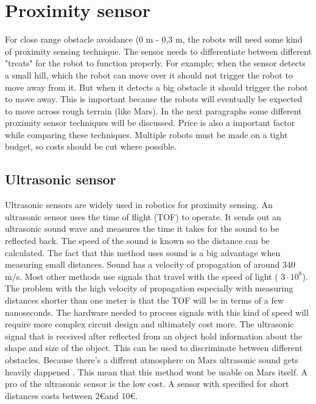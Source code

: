 \documentclass[10pt,a4paper]{article}
\begin{document}
\newpage

\section{Proximity sensor}
For close range obstacle avoidance (0 m - 0,3 m, the robots will need some kind of proximity sensing technique. The sensor needs to differentiate between different "treats" for the robot to function properly. For example; when the sensor detects a small hill, which the robot can move over it should not trigger the robot to move away from it. But when it detects a big obstacle it should trigger the robot to move away. This is important because the robots will eventually be expected to move across rough terrain (like Mars). In the next paragraphs some different proximity sensor techniques will be discussed. Price is also a important factor while comparing these techniques. Multiple robots must be made on a tight budget, so costs should be cut where possible.\\

\subsection{Ultrasonic sensor}
Ultrasonic sensors are widely used in robotics for proximity sensing. An ultrasonic sensor uses the time of flight (TOF) to operate. It sends out an ultrasonic sound wave and measures the time it takes for the sound to be reflected back. The speed of the sound is known so the distance can be calculated. The fact that this method uses sound is a big advantage when measuring small distances. Sound has a velocity of propagation of around 340 m/s. Most other methods use signals that travel with the speed of light ( $3\cdot10^{8}$). The problem with the high velocity of  propagation especially with measuring distances shorter than one meter is that the TOF will be in terms of a few nanoseconds.  The hardware needed to process signals with this kind of speed will require more complex circuit design and ultimately cost more. The ultrasonic signal that is received after reflected from an object hold information about the shape and size of the object. This can be used to discriminate between different obstacles\cite{ultraobject}. Because there's a diffrent atmosphere on Mars ultrasonic sound gets heavily dappened \cite{soundonmars}. This mean that this method wont be usable on Mars itself. A pro of the ultrasonic sensor is the low cost. A sensor with specified for short distances costs between 2\euro and 10\euro.
\end{document}
